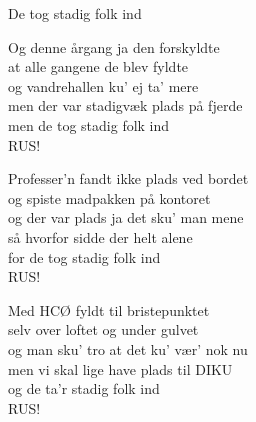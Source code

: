 \begin{song}{De tog stadig folk ind}
  \begin{SBVerse}
    Og denne årgang ja den forskyldte\\
    at alle gangene de blev fyldte\\
    og vandrehallen ku' ej ta' mere\\
    men der var stadigvæk plads på fjerde\\
    men de tog stadig folk ind\\
    RUS!
  \end{SBVerse}

  \begin{SBVerse}
    Professer'n fandt ikke plads ved bordet\\
    og spiste madpakken på kontoret\\
    og der var plads ja det sku' man mene\\
    så hvorfor sidde der helt alene\\
    for de tog stadig folk ind\\
    RUS!
  \end{SBVerse}

  \begin{SBVerse}
    Med HCØ fyldt til bristepunktet\\
    selv over loftet og under gulvet\\
    og man sku' tro at det ku' vær' nok nu\\
    men vi skal lige have plads til DIKU\\
    og de ta'r stadig folk ind\\
    RUS!
  \end{SBVerse}
\end{song}
